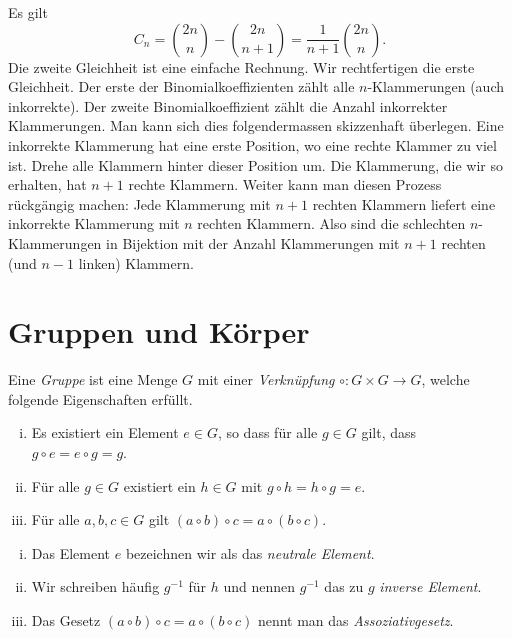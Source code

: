 \documentclass[../main.tex]{subfiles}
\begin{document}
\begin{remark}
  Es gilt
  \[
    C_{n} = \binom{2n}{n} - \binom{2n}{n+1} = \frac{1}{n+1}\binom{2n}{n}.
  \]
  Die zweite Gleichheit ist eine einfache Rechnung.
  Wir rechtfertigen die erste Gleichheit.
  Der erste der Binomialkoeffizienten zählt alle $n$-Klammerungen (auch inkorrekte).
  Der zweite Binomialkoeffizient zählt die Anzahl inkorrekter Klammerungen.
  Man kann sich dies folgendermassen skizzenhaft überlegen.
  Eine inkorrekte Klammerung hat eine erste Position,
  wo eine rechte Klammer zu viel ist.
  Drehe alle Klammern hinter dieser Position um.
  Die Klammerung, die wir so erhalten, hat $n+1$ rechte Klammern.
  Weiter kann man diesen Prozess rückgängig machen:
  Jede Klammerung mit $n+1$ rechten Klammern
  liefert eine inkorrekte Klammerung mit $n$ rechten Klammern.
  Also sind die schlechten $n$-Klammerungen in Bijektion
  mit der Anzahl Klammerungen mit $n+1$ rechten
  (und $n-1$ linken) Klammern.
\end{remark}

\section{Gruppen und Körper}
\begin{definition}
  Eine \emph{Gruppe} ist eine Menge $G$
  mit einer \emph{Verknüpfung} $\circ \colon G \times G \to G$,
  welche folgende Eigenschaften erfüllt.
  \begin{enumerate}[(i)]
    \item Es existiert ein Element $e \in G$, so dass
      für alle $g \in G$ gilt, dass
      $g \circ e = e \circ g = g$.
    \item Für alle $g \in G$ existiert ein $h \in G$
      mit
      $g \circ h = h \circ g = e$.
    \item Für alle $a,b,c \in G$ gilt
      $(a \circ b) \circ c = a \circ (b \circ c)$.
  \end{enumerate}
\end{definition}

\newpage

\begin{notation}
  \leavevmode
  \begin{enumerate}[(i)]
    \item Das Element $e$ bezeichnen wir als das \emph{neutrale Element}.
    \item Wir schreiben häufig $g^{-1}$ für $h$ und nennen $g^{-1}$
      das zu $g$ \emph{inverse Element}.
    \item Das Gesetz $(a \circ b) \circ c = a \circ (b \circ c)$ nennt man das \emph{Assoziativgesetz}.
  \end{enumerate}
\end{notation}
\end{document}
